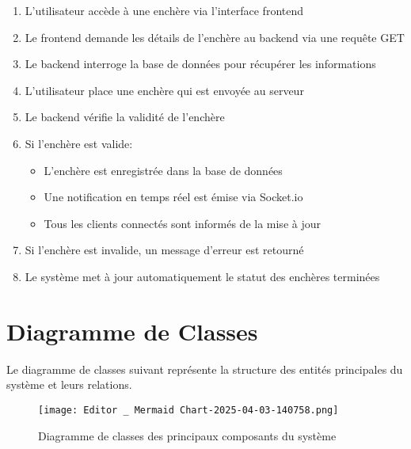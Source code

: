 \begin{enumerate}
    \item L'utilisateur accède à une enchère via l'interface frontend
    \item Le frontend demande les détails de l'enchère au backend via une requête GET
    \item Le backend interroge la base de données pour récupérer les informations
    \item L'utilisateur place une enchère qui est envoyée au serveur
    \item Le backend vérifie la validité de l'enchère
    \item Si l'enchère est valide:
    \begin{itemize}
        \item L'enchère est enregistrée dans la base de données
        \item Une notification en temps réel est émise via Socket.io
        \item Tous les clients connectés sont informés de la mise à jour
    \end{itemize}
    \item Si l'enchère est invalide, un message d'erreur est retourné
    \item Le système met à jour automatiquement le statut des enchères terminées
\end{enumerate}

\section{Diagramme de Classes}
Le diagramme de classes suivant représente la structure des entités principales du système et leurs relations.

\begin{figure}[ht]
    \centering
    \texttt{[image: Editor \_ Mermaid Chart-2025-04-03-140758.png]}
    \caption{Diagramme de classes des principaux composants du système}
    \label{fig:class-diagram}
\end{figure}

